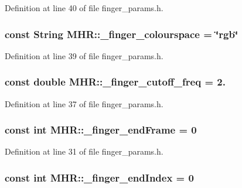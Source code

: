 Definition at line 40 of file finger\+\_\+params.\+h.

\hypertarget{namespace_m_h_r_af6ec9103edc4e3fe7011676f91c83c26}{
\subsubsection[{\+\_\+finger\+\_\+colourspace}]{\setlength{\rightskip}{0pt plus 5cm}const String M\+H\+R\+::\+\_\+finger\+\_\+colourspace = \char`\"{}rgb\char`\"{}}}\label{namespace_m_h_r_af6ec9103edc4e3fe7011676f91c83c26}


Definition at line 39 of file finger\+\_\+params.\+h.

\hypertarget{namespace_m_h_r_a6125713b446a1bdd5bbc0fb9e75fc58e}{
\subsubsection[{\+\_\+finger\+\_\+cutoff\+\_\+freq}]{\setlength{\rightskip}{0pt plus 5cm}const double M\+H\+R\+::\+\_\+finger\+\_\+cutoff\+\_\+freq = 2.}}\label{namespace_m_h_r_a6125713b446a1bdd5bbc0fb9e75fc58e}


Definition at line 37 of file finger\+\_\+params.\+h.

\hypertarget{namespace_m_h_r_aab21e4fd871ccbbdfc656aa4d64aa688}{
\subsubsection[{\+\_\+finger\+\_\+end\+Frame}]{\setlength{\rightskip}{0pt plus 5cm}const int M\+H\+R\+::\+\_\+finger\+\_\+end\+Frame = 0}}\label{namespace_m_h_r_aab21e4fd871ccbbdfc656aa4d64aa688}


Definition at line 31 of file finger\+\_\+params.\+h.

\hypertarget{namespace_m_h_r_a8b1ee45fde805239e5267fb0dcb03735}{
\subsubsection[{\+\_\+finger\+\_\+end\+Index}]{\setlength{\rightskip}{0pt plus 5cm}const int M\+H\+R\+::\+\_\+finger\+\_\+end\+Index = 0}}\label{namespace_m_h_r_a8b1ee45fde805239e5267fb0dcb03735}


